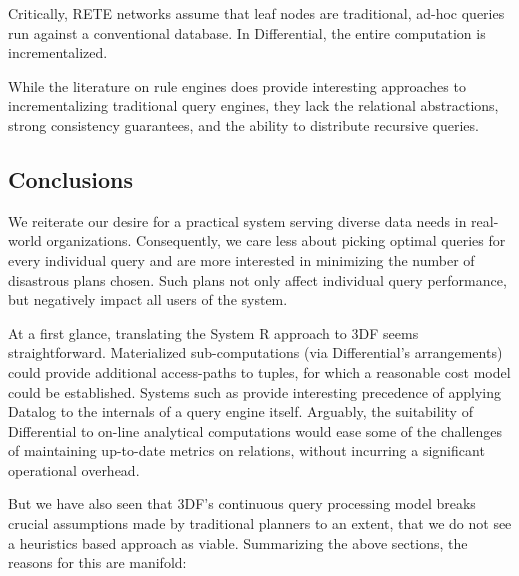 \documentclass[../index.tex]{subfiles}
\begin{document}
Critically, RETE networks assume that leaf nodes are traditional,
ad-hoc queries run against a conventional database. In Differential,
the entire computation is incrementalized.

While the literature on rule engines does provide interesting
approaches to incrementalizing traditional query engines, they lack
the relational abstractions, strong consistency guarantees, and the
ability to distribute recursive queries.

\subsection{Conclusions}

We reiterate our desire for a practical system serving diverse data
needs in real-world organizations. Consequently, we care less about
picking optimal queries for every individual query and are more
interested in minimizing the number of disastrous plans chosen. Such
plans not only affect individual query performance, but negatively
impact all users of the system.

At a first glance, translating the System R approach to 3DF seems
straightforward. Materialized sub-computations (via Differential's
arrangements) could provide additional access-paths to tuples, for
which a reasonable cost model could be established. Systems such as
\cite{condie2008evita} provide interesting precedence of applying
Datalog to the internals of a query engine itself. Arguably, the
suitability of Differential to on-line analytical computations would
ease some of the challenges of maintaining up-to-date metrics on
relations, without incurring a significant operational overhead.

But we have also seen that 3DF's continuous query processing model
breaks crucial assumptions made by traditional planners to an extent,
that we do not see a heuristics based approach as viable. Summarizing
the above sections, the reasons for this are manifold:
\end{document}
